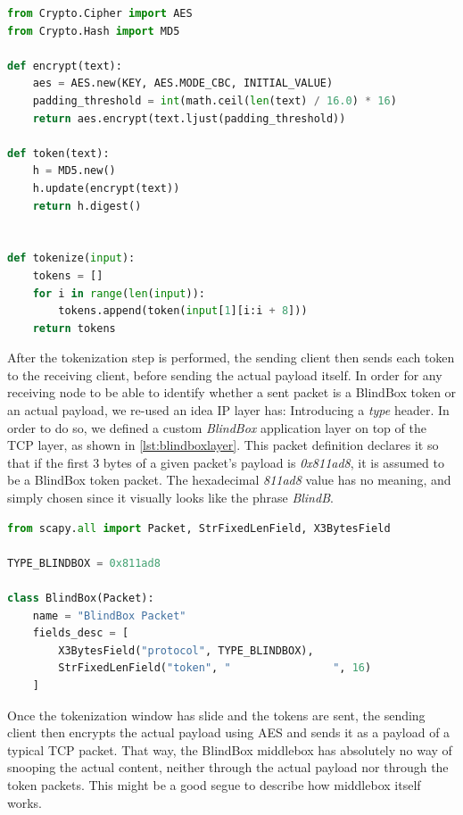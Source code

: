\documentclass{winslabreport}
\begin{document}
\begin{lstlisting}[caption={Tokenization},label={lst:tokenize},language=Python]
from Crypto.Cipher import AES
from Crypto.Hash import MD5

def encrypt(text):
    aes = AES.new(KEY, AES.MODE_CBC, INITIAL_VALUE)
    padding_threshold = int(math.ceil(len(text) / 16.0) * 16)
    return aes.encrypt(text.ljust(padding_threshold))

def token(text):
    h = MD5.new()
    h.update(encrypt(text))
    return h.digest()
    
    
def tokenize(input):
    tokens = []
    for i in range(len(input)):
        tokens.append(token(input[1][i:i + 8]))
    return tokens
\end{lstlisting}

After the tokenization step is performed, the sending client then sends each token to the receiving client, before sending the actual payload itself. In order for any receiving node to be able to identify whether a sent packet is a BlindBox token or an actual payload, we re-used an idea IP layer has: Introducing a \emph{type} header. In order to do so, we defined a custom \emph{BlindBox} application layer on top of the TCP layer, as shown in \autoref{lst:blindboxlayer}. This packet definition declares it so that if the first 3 bytes of a given packet's payload is \emph{0x811ad8}, it is assumed to be a BlindBox token packet. The hexadecimal \emph{811ad8} value has no meaning, and simply chosen since it visually looks like the phrase \emph{BlindB}.

\begin{lstlisting}[caption={Layer Definition},label={lst:blindboxlayer},language=Python]
from scapy.all import Packet, StrFixedLenField, X3BytesField

TYPE_BLINDBOX = 0x811ad8

class BlindBox(Packet):
    name = "BlindBox Packet"
    fields_desc = [
        X3BytesField("protocol", TYPE_BLINDBOX),
        StrFixedLenField("token", "                ", 16)
    ]
\end{lstlisting}

Once the tokenization window has slide and the tokens are sent, the sending client then encrypts the actual payload using AES and sends it as a payload of a typical TCP packet. That way, the BlindBox middlebox has absolutely no way of snooping the actual content, neither through the actual payload nor through the token packets. This might be a good segue to describe how middlebox itself works.
\end{document}
